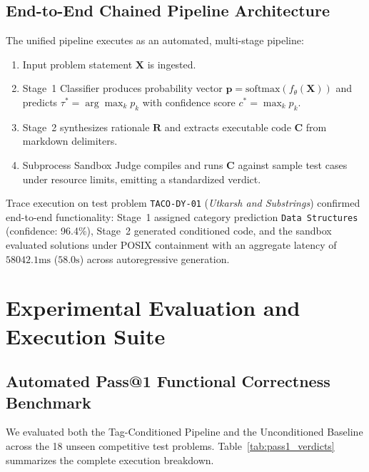 \documentclass[lettersize,journal]{IEEEtran}
\begin{document}
\subsection{End-to-End Chained Pipeline Architecture}
The unified pipeline executes as an automated, multi-stage pipeline:
\begin{enumerate}
    \item Input problem statement $\mathbf{X}$ is ingested.
    \item Stage~1 Classifier produces probability vector $\mathbf{p} = \text{softmax}(f_\theta(\mathbf{X}))$ and predicts $\tau^* = \arg\max_k p_k$ with confidence score $c^* = \max_k p_k$.
    \item Stage~2 synthesizes rationale $\mathbf{R}$ and extracts executable code $\mathbf{C}$ from markdown delimiters.
    \item Subprocess Sandbox Judge compiles and runs $\mathbf{C}$ against sample test cases under resource limits, emitting a standardized verdict.
\end{enumerate}

Trace execution on test problem \texttt{TACO-DY-01} (\textit{Utkarsh and Substrings}) confirmed end-to-end functionality: Stage~1 assigned category prediction \texttt{Data Structures} (confidence: 96.4\%), Stage~2 generated conditioned code, and the sandbox evaluated solutions under POSIX containment with an aggregate latency of $58042.1\text{ms}$ ($58.0\text{s}$) across autoregressive generation.

\section{Experimental Evaluation and Execution Suite}
\subsection{Automated Pass@1 Functional Correctness Benchmark}
We evaluated both the Tag-Conditioned Pipeline and the Unconditioned Baseline across the 18 unseen competitive test problems. Table~\ref{tab:pass1_verdicts} summarizes the complete execution breakdown.
\end{document}
